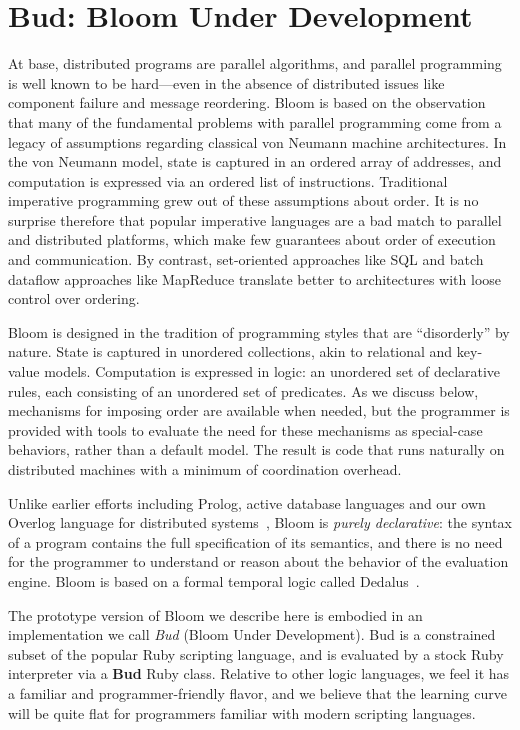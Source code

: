 \section{Bud: Bloom Under Development}
\label{sec:lang}
At base, distributed programs are parallel algorithms, and parallel programming is well known to be hard---even in the absence of distributed issues like component failure and message reordering.  Bloom is based on the observation that many of the fundamental problems with parallel programming come from a legacy of assumptions regarding classical von Neumann machine architectures.  In the von Neumann model, state is captured in an ordered array of addresses, and computation is expressed via an ordered list of instructions.  Traditional imperative programming grew out of these assumptions about order.  It is no surprise therefore that popular imperative languages are a bad match to parallel and distributed platforms, which make few guarantees about order of execution and communication. By contrast, set-oriented approaches like SQL and batch dataflow approaches like MapReduce translate better to architectures with loose control over ordering.

Bloom is designed in the tradition of programming styles that are ``disorderly'' by nature.  State is captured in unordered collections, akin to relational and key-value models.  Computation is expressed in logic: an unordered set of declarative rules, each consisting of an unordered set of predicates.  As we discuss below, mechanisms for imposing order are available when needed, but the programmer is provided with tools to evaluate the need for these mechanisms as special-case behaviors, rather than a default model.  The result is code that runs naturally on distributed machines with a minimum of coordination overhead.
 
Unlike earlier efforts including Prolog, active database languages%
and our own Overlog language for distributed systems~\cite{p2}, Bloom is {\em purely declarative}: the syntax of a program contains the full specification of its semantics, and there is no need for the programmer to understand or reason about the behavior of the evaluation engine.  Bloom is based on a formal temporal logic called Dedalus~\cite{dedalus-techr}.

The prototype version of Bloom we describe here is embodied in an implementation we call {\em Bud} (Bloom Under Development).  Bud is a constrained subset of the popular Ruby scripting language, and is evaluated by a stock Ruby interpreter via a \textbf{Bud} Ruby class.  Relative to other logic languages, we feel it has a familiar and programmer-friendly flavor, and we believe that the learning curve will be quite flat for programmers familiar with modern scripting languages.

